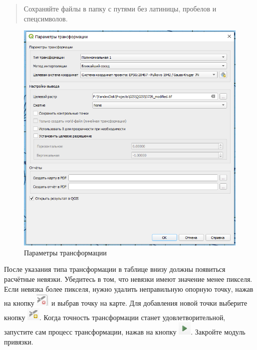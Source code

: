 \documentclass[
  12pt,
]{book}
\begin{document}
\begin{quote}
Сохраняйте файлы в папку с путями без латиницы, пробелов и спецсимволов.
\end{quote}

\begin{figure}
\centering
\includegraphics{images/Georeference/Transformation_parameters.png}
\caption{Параметры трансформации}
\end{figure}

После указания типа трансформации в таблице внизу должны появиться расчётные невязки. Убедитесь в том, что невязки имеют значение менее пикселя. Если невязка более пикселя, нужно удалить неправильную опорную точку, нажав на кнопку \includegraphics{images/Georeference/Delete_point.png} и выбрав точку на карте. Для добавления новой точки выберите кнопку \includegraphics{images/Georeference/Add_point.png}. Когда точность трансформации станет удовлетворительной, запустите сам процесс трансформации, нажав на кнопку \includegraphics{images/Georeference/Transformation_button.png}. Закройте модуль привязки.
\end{document}
